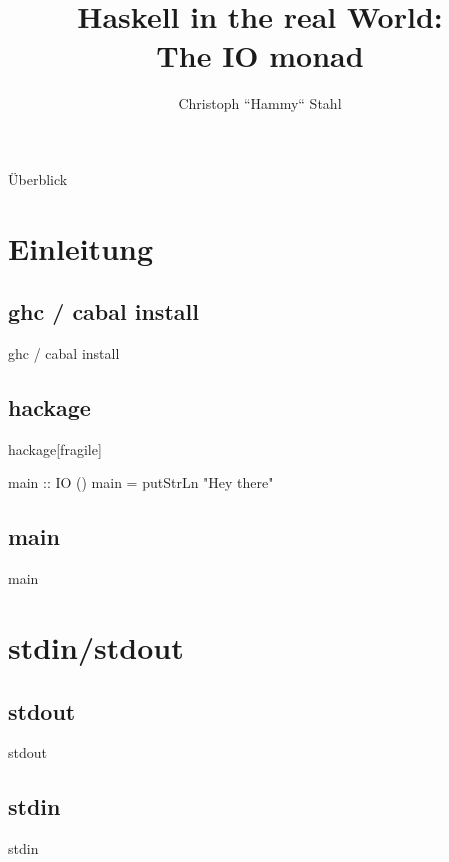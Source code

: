 \documentclass{beamer}
\title{Haskell in the real World: \\ The IO monad}
\author{Christoph ``Hammy`` Stahl}
\begin{document}
\begin{frame}
	\maketitle
\end{frame}
\begin{frame}{Überblick}
	\tableofcontents
\end{frame}

\section{Einleitung}
\subsection{ghc / cabal install}
\begin{frame}{ghc / cabal install}

\end{frame}

\subsection{hackage}
\begin{frame}{hackage}[fragile]
\begin{code}
main :: IO ()
main = putStrLn "Hey there"
\end{code}
\end{frame}

\subsection{main}
\begin{frame}{main}
\end{frame}

\section{stdin/stdout}
\subsection{stdout}
\begin{frame}{stdout}
\end{frame}

\subsection{stdin}
\begin{frame}{stdin}
\end{frame}
\end{document}
